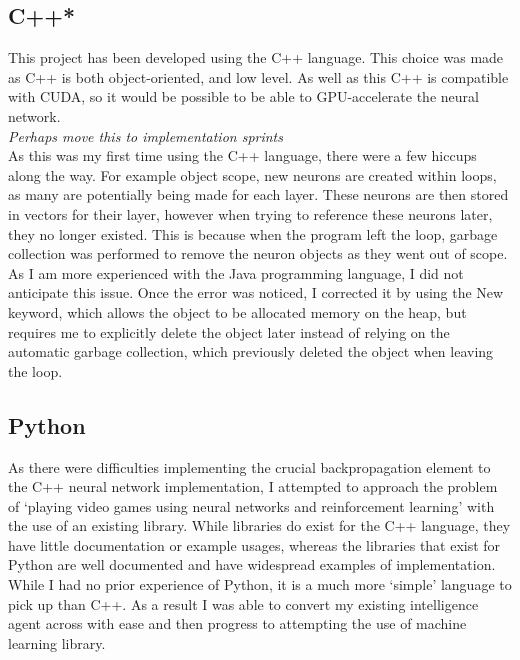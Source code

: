 \documentclass[10pt]{article}
\begin{document}
	\medskip
	
	\subsection{C++*}
		This project has been developed using the C++ language. This choice was made as C++ is both object-oriented, and low level. As well as this C++ is compatible with CUDA, so it would be possible to be able to GPU-accelerate the neural network.\\
	
		\textit{Perhaps move this to implementation sprints}\\
		
		As this was my first time using the C++ language, there were a few hiccups along the way. For example object scope, new neurons are created within loops, as many are potentially being made for each layer. These neurons are then stored in vectors for their layer, however when trying to reference these neurons later, they no longer existed. This is because when the program left the loop, garbage collection was performed to remove the neuron objects as they went out of scope.\\
		
		As I am more experienced with the Java programming language, I did not anticipate this issue. Once the error was noticed, I corrected it by using the New keyword, which allows the object to be allocated memory on the heap, but requires me to explicitly delete the object later instead of relying on the automatic garbage collection, which previously deleted the object when leaving the loop.
	
	\medskip
	
	\subsection{Python}
		As there were difficulties implementing the crucial backpropagation element to the C++ neural network implementation, I attempted to approach the problem of `playing video games using neural networks and reinforcement learning' with the use of an existing library. While libraries do exist for the C++ language, they have little documentation or example usages, whereas the libraries that exist for Python are well documented and have widespread examples of implementation.\\
		
		While I had no prior experience of Python, it is a much more `simple' language to pick up than C++. As a result I was able to convert my existing intelligence agent across with ease and then progress to attempting the use of machine learning library.
	
\end{document}
